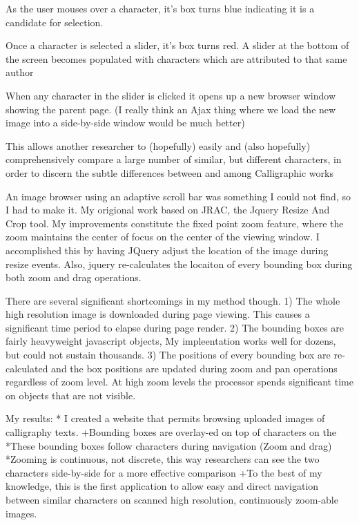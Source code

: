                As the user mouses over a character, it's box turns blue indicating it is a candidate for selection.
                
                Once a character is selected a slider, it's box turns red. A slider at the bottom of the screen becomes populated with characters which are attributed to that same author
                
                When any character in the slider is clicked it opens up a new browser window showing the parent page.  (I really think an Ajax thing where we load the new image into a side-by-side window would be much better)
                
                This allows another researcher to (hopefully) easily and (also hopefully) comprehensively compare a large number of similar, but different characters, in order to discern the subtle differences between and among Calligraphic works
                
                An image browser using an adaptive scroll bar was something I could not find, so I had to make it.  My origional work based on JRAC, the Jquery Resize And Crop tool.  My improvements constitute the fixed point zoom feature, where the zoom maintains the center of focus on the center of the viewing window.  I accomplished this by having JQuery adjust the location of the image during resize events.  Also, jquery re-calculates the locaiton of every bounding box during both zoom and drag operations.
                
                There are several significant shortcomings in my method though.
                1)  The whole high resolution image is downloaded during page viewing. This causes a significant time period to elapse during page render.
                2)  The bounding boxes are fairly heavyweight javascript objects, My impleentation works well for dozens, but could not sustain thousands.
                3)  The positions of every bounding box are re-calculated and the box positions are updated during zoom and pan operations regardless of zoom level.  At high zoom levels the processor spends significant time on objects that are not visible.
                
                
                    My results:
        *  I created a website that permits browsing uploaded images of calligraphy texts.
            +Bounding boxes are overlay-ed on top of characters on the 
                *These bounding boxes follow characters during navigation (Zoom and drag)
                *Zooming is continuous, not discrete, this way researchers can see the two characters side-by-side for a more effective comparison
            +To the best of my knowledge, this is the first application to allow easy and direct navigation between similar characters on scanned high resolution, continuously zoom-able images.
            

